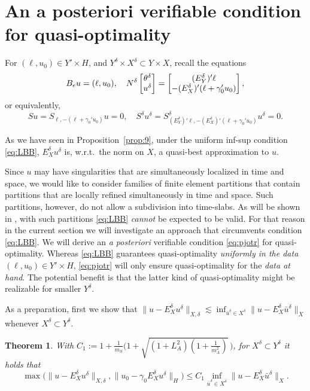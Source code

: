 \documentclass{amsart}
\newtheorem{theorem}{Theorem}[section]
\numberwithin{equation}{section}
\newcommand{\NN}{N}
\newcommand{\1}{\mathbb 1}
\begin{document}
\section{An a posteriori verifiable condition for quasi-optimality} \label{sec:Pjotr}
For $(\ell,u_0) \in Y' \times H$, and $Y^\delta \times X^\delta \subset Y \times X$, recall the equations 
$$
B_e u=(\ell,u_0),\quad \NN^\delta
\left[\begin{array}{@{}c@{}} \theta^\delta \\ u^\delta \end{array}\right]=
\left[\begin{array}{@{}c@{}} (E_Y^\delta)'\ell \\ -(E_X^\delta)'(\ell+\gamma_0' u_0) \end{array}\right],
$$
or equivalently,
$$
Su=S_{\ell,-(\ell+\gamma_0' u_0)} u=0,\quad S^\delta u^\delta=S^\delta_{(E_Y^\delta)'\ell,-(E_X^\delta)'(\ell+\gamma_0' u_0)} u^\delta=0.
$$


As we have seen in Proposition~\ref{prop:9}, under the uniform inf-sup condition \eqref{eq:LBB}, 
$E_X^\delta u^\delta$ is, w.r.t.~the norm on $X$, a quasi-best approximation to $u$. 

Since $u$ may have singularities that are simultaneously localized in time and space, we would like to consider families of finite element partitions that contain partitions that are locally refined simultaneously in time and space. Such partitions, however, do not allow a subdivision into time-slabs.
As will be shown in \cite[Appendix A]{75.293}, with such partitions \eqref{eq:LBB} \emph{cannot} be expected to be valid.
 For that reason in the current section we will investigate an approach that circumvents condition \eqref{eq:LBB}.
We will derive an \emph{a posteriori} verifiable condition \eqref{eq:pjotr} for quasi-optimality.  Whereas  \eqref{eq:LBB} guarantees quasi-optimality \emph{uniformly in the data} $(\ell,u_0) \in Y' \times H$, \eqref{eq:pjotr} will only ensure quasi-optimality for the \emph{data at hand}. The potential benefit is that the latter kind of quasi-optimality might be realizable for smaller $Y^\delta$.

As a preparation, first we show that  $\|u-E_X^\delta u^\delta\|_{X,\delta} \lesssim \inf_{\bar{u}^\delta \in X^\delta} \|u-E_X^\delta \bar{u}^\delta\|_{X}$ whenever $X^\delta \subset Y^\delta$.

\begin{theorem} \label{thm:quasi-opt} With $C_1:=1+\tfrac{1}{m_S}\Big(1+\sqrt{(1+L_A^2)(1 + \frac{1}{m_A^2})}\, \Big)$, 
for $X^\delta \subset Y^\delta$ it holds that
$$
\max\big(\|u-E_X^\delta u^\delta\|_{X,\delta},\|u_0-\gamma_0 E_X^\delta u^\delta\|_H\big)  \leq C_1 \inf_{\bar{u}^\delta \in X^\delta} \|u-E_X^\delta \bar{u}^\delta\|_{X}.
$$
\end{theorem}
\end{document}
